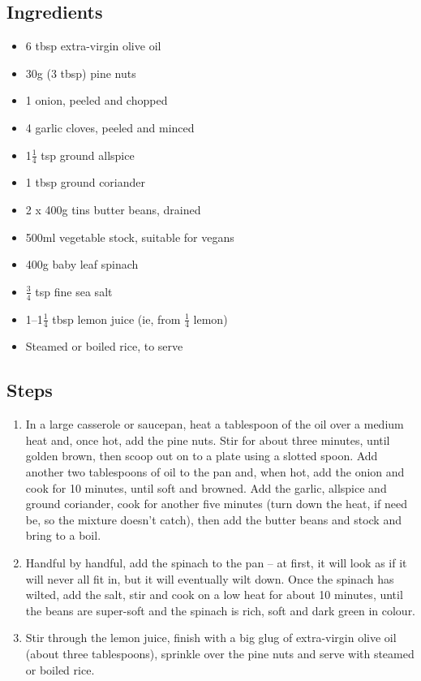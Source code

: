 \documentclass{book}
\begin{document}
\subsection*{Ingredients}
\begin{itemize}
\item 6 tbsp extra-virgin olive oil
\item 30g (3 tbsp) pine nuts
\item 1 onion, peeled and chopped
\item 4 garlic cloves, peeled and minced
\item 1$\frac{1}{4}$ tsp ground allspice
\item 1 tbsp ground coriander
\item 2 x 400g tins butter beans, drained
\item 500ml vegetable stock, suitable for vegans
\item 400g baby leaf spinach
\item $\frac{3}{4}$ tsp fine sea salt
\item 1–1$\frac{1}{4}$ tbsp lemon juice (ie, from $\frac{1}{4}$ lemon)
\item Steamed or boiled rice, to serve
\end{itemize}

\subsection*{Steps}
\begin{enumerate}
\item In a large casserole or saucepan, heat a tablespoon of the oil over a medium heat and, once hot, add the pine nuts. Stir for about three minutes, until golden brown, then scoop out on to a plate using a slotted spoon. Add another two tablespoons of oil to the pan and, when hot, add the onion and cook for 10 minutes, until soft and browned. Add the garlic, allspice and ground coriander, cook for another five minutes (turn down the heat, if need be, so the mixture doesn’t catch), then add the butter beans and stock and bring to a boil.
\item Handful by handful, add the spinach to the pan – at first, it will look as if it will never all fit in, but it will eventually wilt down. Once the spinach has wilted, add the salt, stir and cook on a low heat for about 10 minutes, until the beans are super-soft and the spinach is rich, soft and dark green in colour.
\item Stir through the lemon juice, finish with a big glug of extra-virgin olive oil (about three tablespoons), sprinkle over the pine nuts and serve with steamed or boiled rice.
\end{enumerate}
\newpage
\end{document}

